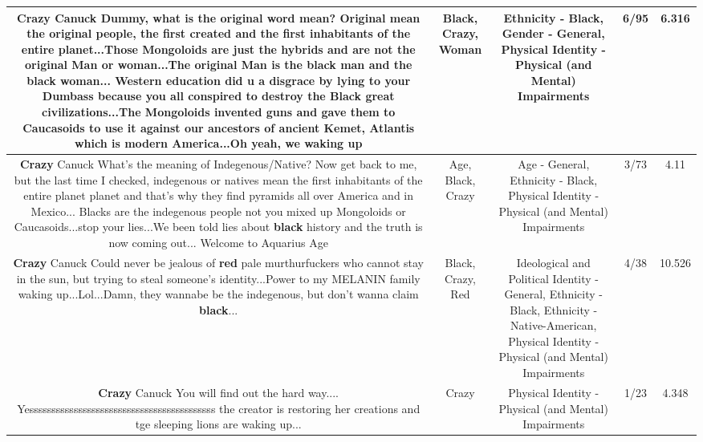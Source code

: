 \documentclass[11pt]{article}
\newlength\mylength
\begin{document}
\begin{center}
\begin{longtable}{|C{.65\mylength}|C{.30\mylength}|C{.12\mylength}|C{.12\mylength}|C{.12\mylength}|}
  \small \@\textbf{Crazy} Canuck Dummy, what is the original word mean? Original mean the original people, the first created and the first inhabitants of the entire planet...Those Mongoloids are just the hybrids and are not the original Man or \textbf{woman}...The original Man is the \textbf{black} man and the \textbf{black} \textbf{woman}... Western education did u a disgrace by lying to your Dumbass because you all conspired to destroy the \textbf{Black} great civilizations...The Mongoloids invented guns and gave them to Caucasoids to use it against our ancestors of ancient Kemet, Atlantis which is modern America...Oh yeah, we waking up\normalsize   & Black, Crazy, Woman & Ethnicity - Black, Gender - General, Physical Identity - Physical (and Mental) Impairments & 6/95 & 6.316 \\  \hline
  \small \@\textbf{Crazy} Canuck What's the meaning of Indegenous/Native? Now get back to me, but the last time I checked, indegenous or natives mean the first inhabitants of the entire planet planet and that's why they find pyramids all over America and in Mexico... Blacks are the indegenous people not you mixed up Mongoloids or Caucasoids...stop your lies...We been told lies about \textbf{black} history and the truth is now coming out... Welcome to Aquarius Age\normalsize   & Age, Black, Crazy & Age - General, Ethnicity - Black, Physical Identity - Physical (and Mental) Impairments & 3/73 & 4.11 \\  \hline
  \small \@\textbf{Crazy} Canuck  Could never be jealous of \textbf{r\textbf{ed}} pale murthurfuckers who cannot stay in the sun, but trying to steal someone's identity...Power to my MELANIN family waking up...Lol...Damn, they wannabe be the indegenous, but don't wanna claim \textbf{black}...\normalsize   & Black, Crazy, Red &  Ideological and Political Identity - General, Ethnicity - Black, Ethnicity - Native-American, Physical Identity - Physical (and Mental) Impairments & 4/38 & 10.526 \\  \hline
  \small \@\textbf{Crazy} Canuck You will find out the hard way.... Yessssssssssssssssssssssssssssssssssssssssss the creator is restoring her creations and tge sleeping lions are waking up...\normalsize   & Crazy & Physical Identity - Physical (and Mental) Impairments & 1/23 & 4.348 \\  \hline

\end{longtable}
\end{center}
\end{document}
